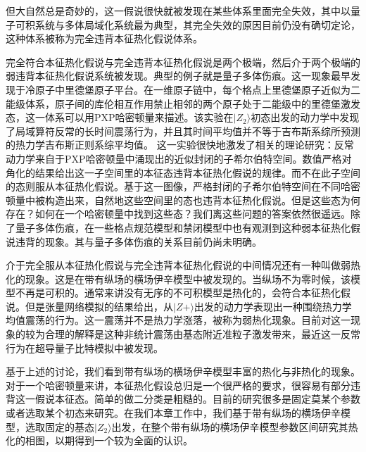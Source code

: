 但大自然总是奇妙的，这一假说很快就被发现在某些体系里面完全失效，其中以量子可积系统\cite{kinoshita2006quantum,Rigol2007Relaxation,Calabrese2011Quantum,essler2016quench,vidmar2016generalized}与多体局域化系统最为典型\cite{basko2006metal,Serbyn2013local,Huse2014Phenomenology}，其完全失效的原因目前仍没有确切定论，这种体系被称为完全违背本征热化假说体系。

完全符合本征热化假说与完全违背本征热化假说是两个极端，然后介于两个极端的弱违背本征热化假说系统被发现。典型的例子就是量子多体伤痕。这一现象最早发现于冷原子中里德堡原子平台\cite{bernien2017probing}。在一维原子链中，每个格点上里德堡原子近似为二能级体系，原子间的库伦相互作用禁止相邻的两个原子处于二能级中的里德堡激发态，这一体系可以用PXP哈密顿量来描述。该实验在$|Z_2\rangle$初态出发的动力学中发现了局域算符反常的长时间震荡行为，并且其时间平均值并不等于吉布斯系综所预测的热力学吉布斯正则系综平均值。
这一实验很快地激发了相关的理论研究\cite{turner2018weak,Turner2018quantum,Ho2019periodic,Choi2019emergent,Michailidis2020slow,serbyn2021quantum,Yao2022quantum}：反常动力学来自于PXP哈密顿量中涌现出的近似封闭的子希尔伯特空间。数值严格对角化的结果给出这一子空间里的本征态违背本征热化假说的规律。而不在此子空间的态则服从本征热化假说。基于这一图像，严格封闭的子希尔伯特空间在不同哈密顿量中被构造出来\cite{Shiraishi2017Systematic,Moudgalya2018exact,Moudgalya2018entanglement,Khemani2020lacalization,Moudgalya2020eta,Lin2019Exact,Schecter2019weak,Mark2020unified,Mark2020eta,Pakrouski2020many,Ren2021quasi,ODea2020from}，自然地这些空间里的态也违背本征热化假说。但是这些态为何存在？如何在一个哈密顿量中找到这些态？我们离这些问题的答案依然很遥远。除了量子多体伤痕，在一些格点规范模型\cite{magnifico2020real,Chanda2020confinement,Borla2020confined}和禁闭模型\cite{Nandkishore2017many,kormos2017real,Robinson2019signature,Yang2020Hilbert,Castro2020entanglement}中也有观测到这种弱本征热化假说违背的现象。其与量子多体伤痕的关系目前仍尚未明确\cite{serbyn2021quantum}。


介于完全服从本征热化假说与完全违背本征热化假说的中间情况还有一种叫做弱热化的现象\cite{banuls2011strong}。这是在带有纵场的横场伊辛模型中被发现的。当纵场不为零时候，该模型不再是可积的。通常来讲没有无序的不可积模型是热化的，会符合本征热化假说。但是张量网络模拟的结果给出，从$|Z+\rangle$出发的动力学表现出一种围绕热力学均值震荡的行为。这一震荡并不是热力学涨落，被称为弱热化现象。目前对这一现象的较为合理的解释是这种非统计震荡由基态附近准粒子激发带来\cite{Lin2017quasiparticle}，最近这一反常行为在超导量子比特模拟中被发现\cite{Chen2021observation}。

基于上述的讨论，我们看到带有纵场的横场伊辛模型丰富的热化与非热化的现象。对于一个哈密顿量来讲，本征热化假设总归是一个很严格的要求，很容易有部分违背这一假说本征态。简单的做二分类是粗糙的。目前的研究很多是固定莫某个参数或者选取某个初态来研究。在我们本章工作中，我们基于带有纵场的横场伊辛模型，选取固定的基态$|Z_2\rangle$出发，在整个带有纵场的横场伊辛模型参数区间研究其热化的相图，以期得到一个较为全面的认识。

